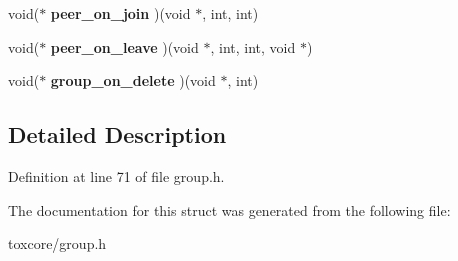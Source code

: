 \begin{DoxyCompactItemize}
\item 
\hypertarget{struct_group__c_a218cd2e97bdb682b90f72faa6eb08576}{void($\ast$ {\bfseries peer\+\_\+on\+\_\+join} )(void $\ast$, int, int)}\label{struct_group__c_a218cd2e97bdb682b90f72faa6eb08576}

\item 
\hypertarget{struct_group__c_a7a79b984292a5ea1f68aca7b73067370}{void($\ast$ {\bfseries peer\+\_\+on\+\_\+leave} )(void $\ast$, int, int, void $\ast$)}\label{struct_group__c_a7a79b984292a5ea1f68aca7b73067370}

\item 
\hypertarget{struct_group__c_a43df326d671eb30dd294d5d71d3cd09c}{void($\ast$ {\bfseries group\+\_\+on\+\_\+delete} )(void $\ast$, int)}\label{struct_group__c_a43df326d671eb30dd294d5d71d3cd09c}

\end{DoxyCompactItemize}


\subsection{Detailed Description}


Definition at line 71 of file group.\+h.



The documentation for this struct was generated from the following file\+:\begin{DoxyCompactItemize}
\item 
toxcore/group.\+h\end{DoxyCompactItemize}

